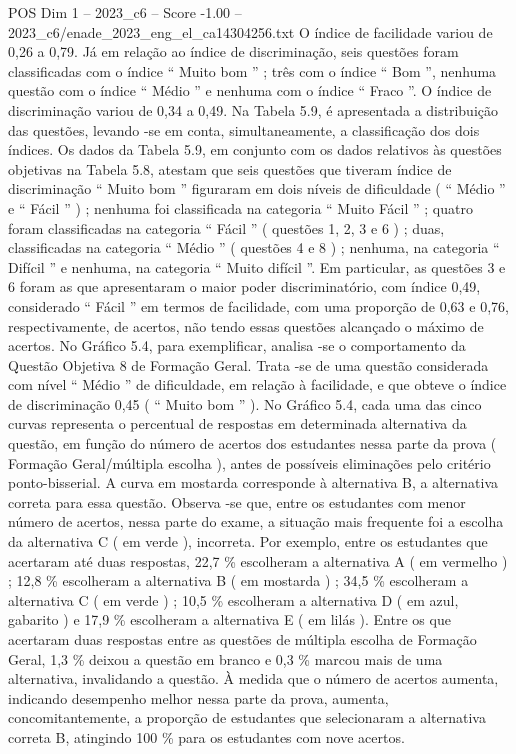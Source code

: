 \begin{textsample}{POS Dim 1 – 2023\_c6 – Score -1.00 – 2023\_c6/enade\_2023\_eng\_el\_ca14304256.txt}
O índice de facilidade variou de 0,26 a 0,79.
Já em relação ao índice de discriminação, seis questões foram classificadas com o índice “ Muito bom ” ; três com o índice “ Bom ”, nenhuma questão com o índice “ Médio ” e nenhuma com o índice “ Fraco ”.
O índice de discriminação variou de 0,34 a 0,49.
Na Tabela 5.9, é apresentada a distribuição das questões, levando -se em conta, simultaneamente, a classificação dos dois índices.
Os dados da Tabela 5.9, em conjunto com os dados relativos às questões objetivas na Tabela 5.8, atestam que seis questões que tiveram índice de discriminação “ Muito bom ” figuraram em dois níveis de dificuldade ( “ Médio ” e “ Fácil ” ) ; nenhuma foi classificada na categoria “ Muito Fácil ” ; quatro foram classificadas na categoria “ Fácil ” ( questões 1, 2, 3 e 6 ) ; duas, classificadas na categoria “ Médio ” ( questões 4 e 8 ) ; nenhuma, na categoria “ Difícil ” e nenhuma, na categoria “ Muito difícil ”.
Em particular, as questões 3 e 6 foram as que apresentaram o maior poder discriminatório, com índice 0,49, considerado “ Fácil ” em termos de facilidade, com uma proporção de 0,63 e 0,76, respectivamente, de acertos, não tendo essas questões alcançado o máximo de acertos.
No Gráfico 5.4, para exemplificar, analisa -se o comportamento da Questão Objetiva 8 de Formação Geral.
Trata -se de uma questão considerada com nível “ Médio ” de dificuldade, em relação à facilidade, e que obteve o índice de discriminação 0,45 ( “ Muito bom ” ).
No Gráfico 5.4, cada uma das cinco curvas representa o percentual de respostas em determinada alternativa da questão, em função do número de acertos dos estudantes nessa parte da prova ( Formação Geral/múltipla escolha ), antes de possíveis eliminações pelo critério ponto-bisserial.
A curva em mostarda corresponde à alternativa B, a alternativa correta para essa questão.
Observa -se que, entre os estudantes com menor número de acertos, nessa parte do exame, a situação mais frequente foi a escolha da alternativa C ( em verde ), incorreta.
Por exemplo, entre os estudantes que acertaram até duas respostas, 22,7 \% escolheram a alternativa A ( em vermelho ) ; 12,8 \% escolheram a alternativa B ( em mostarda ) ; 34,5 \% escolheram a alternativa C ( em verde ) ; 10,5 \% escolheram a alternativa D ( em azul, gabarito ) e 17,9 \% escolheram a alternativa E ( em lilás ).
Entre os que acertaram duas respostas entre as questões de múltipla escolha de Formação Geral, 1,3 \% deixou a questão em branco e 0,3 \% marcou mais de uma alternativa, invalidando a questão.
À medida que o número de acertos aumenta, indicando desempenho melhor nessa parte da prova, aumenta, concomitantemente, a proporção de estudantes que selecionaram a alternativa correta B, atingindo 100 \% para os estudantes com nove acertos.

\end{textsample}
